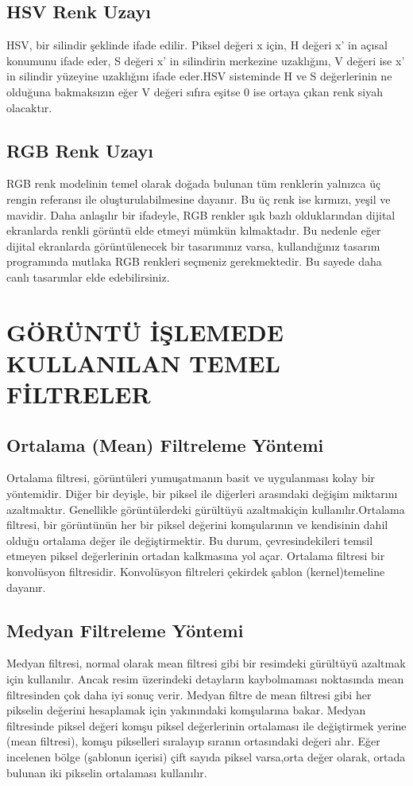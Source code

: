 \subsection{HSV Renk Uzayı}
\cite{hsv}
HSV, bir silindir şeklinde ifade edilir. Piksel değeri x için, H değeri x’ in açısal konumunu ifade eder, S değeri x’ in silindirin merkezine uzaklığını, V değeri ise x’ in silindir yüzeyine uzaklığını ifade eder.HSV sisteminde H ve S değerlerinin ne olduğuna bakmaksızın eğer V değeri sıfıra eşitse 0 ise ortaya çıkan renk siyah olacaktır.
\subsection{RGB Renk Uzayı}
\cite{rgb}
 RGB renk modelinin temel olarak doğada bulunan tüm renklerin yalnızca üç rengin referansı ile oluşturulabilmesine dayanır. Bu üç renk ise kırmızı, yeşil ve mavidir. Daha anlaşılır bir ifadeyle, RGB renkler ışık bazlı olduklarından dijital ekranlarda renkli görüntü elde etmeyi mümkün kılmaktadır. Bu nedenle eğer dijital ekranlarda görüntülenecek bir tasarımınız varsa, kullandığınız tasarım programında mutlaka RGB renkleri seçmeniz gerekmektedir. Bu sayede daha canlı tasarımlar elde edebilirsiniz.


 \section{GÖRÜNTÜ İŞLEMEDE KULLANILAN TEMEL FİLTRELER}
 \subsection{Ortalama (Mean) Filtreleme Yöntemi}
\cite{filtreleme}Ortalama filtresi, görüntüleri yumuşatmanın basit ve uygulanması kolay bir yöntemidir. Diğer bir deyişle, bir piksel ile diğerleri arasındaki değişim miktarını azaltmaktır. Genellikle görüntülerdeki gürültüyü azaltmakiçin kullanılır.Ortalama filtresi, bir görüntünün her bir piksel değerini komşularının ve kendisinin dahil olduğu ortalama değer ile değiştirmektir. Bu durum, çevresindekileri temsil etmeyen piksel değerlerinin ortadan kalkmasına yol açar. Ortalama filtresi bir konvolüsyon filtresidir. Konvolüsyon filtreleri çekirdek şablon (kernel)temeline dayanır. 
\subsection{Medyan Filtreleme Yöntemi}
Medyan filtresi, normal olarak mean filtresi gibi bir resimdeki gürültüyü azaltmak için kullanılır. Ancak resim üzerindeki detayların kaybolmaması noktasında mean filtresinden çok daha iyi sonuç verir. Medyan filtre de mean filtresi gibi her pikselin değerini hesaplamak için yakınındaki komşularına bakar. Medyan filtresinde piksel değeri komşu piksel değerlerinin ortalaması ile değiştirmek yerine (mean filtresi), komşu pikselleri sıralayıp sıranın ortasındaki değeri alır. Eğer incelenen bölge (şablonun içerisi) çift sayıda piksel varsa,orta değer olarak, ortada bulunan iki pikselin ortalaması kullanılır.
